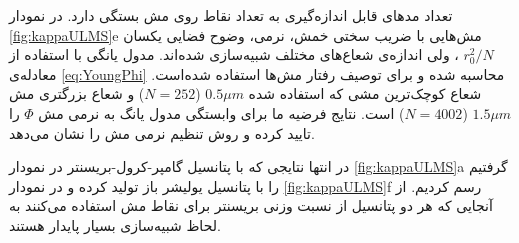 تعداد مد‌های قابل اندازه‌گیری به تعداد نقاط روی مش بستگی دارد. در نمودار
\ref{fig:kappaULMS}e
مش‌هایی با ضریب سختی خمش، نرمی، وضوح فضایی یکسان
$r_0^2/N$
، ولی اندازه‌ی شعاع‌های مختلف شبیه‌سازی شده‌اند. مدول یانگی‌ با استفاده از معادله‌ی
\ref{eq:YoungPhi}
محاسبه شده و برای توصیف رفتار مش‌ها استفاده شده‌است. شعاع کوچک‌ترین مشی که استفاده شده
$0.5\mu m$ ($N=252$)
و شعاع بزرگتری مش
$1.5\mu m$ ($N=4002$)
است. نتایج فرضیه ما برای وابستگی مدول یانگ به نرمی مش
$\Phi$
را تایید کرده و روش تنظیم نرمی مش را نشان می‌دهد.

در انتها نتایجی که با پتانسیل گامپر-کرول-بریسنتر در نمودار 
\ref{fig:kappaULMS}a
گرفتیم را با پتانسیل یولیشر 
\cite{Julicher1996}
باز تولید کرده و در نمودار 
\ref{fig:kappaULMS}f
رسم کردیم. از آنجایی که هر دو پتانسیل از نسبت وزنی بریسنتر برای نقاط مش استفاده می‌کنند به لحاظ شبیه‌سازی بسیار پایدار هستند. 
























